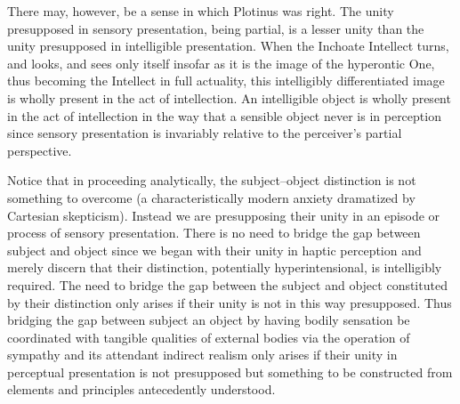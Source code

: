 There may, however, be a sense in which Plotinus was right. The unity presupposed in sensory presentation, being partial, is a lesser unity than the unity presupposed in intelligible presentation. When the Inchoate Intellect turns, and looks, and sees only itself insofar as it is the image of the hyperontic One, thus becoming the Intellect in full actuality, this intelligibly differentiated image is wholly present in the act of intellection. An intelligible object is wholly present in the act of intellection in the way that a sensible object never is in perception since sensory presentation is invariably relative to the perceiver's partial perspective.


Notice that in proceeding analytically, the subject--object distinction is not something to overcome (a characteristically modern anxiety dramatized by Cartesian skepticism). Instead we are presupposing their unity in an episode or process of sensory presentation. There is no need to bridge the gap between subject and object since we began with their unity in haptic perception and merely discern that their distinction, potentially hyperintensional, is intelligibly required. The need to bridge the gap between the subject and object constituted by their distinction only arises if their unity is not in this way presupposed. Thus bridging the gap between subject an object by having bodily sensation be coordinated with tangible qualities of external bodies via the operation of sympathy and its attendant indirect realism only arises if their unity in perceptual presentation is not presupposed but something to be constructed from elements and principles antecedently understood. 

